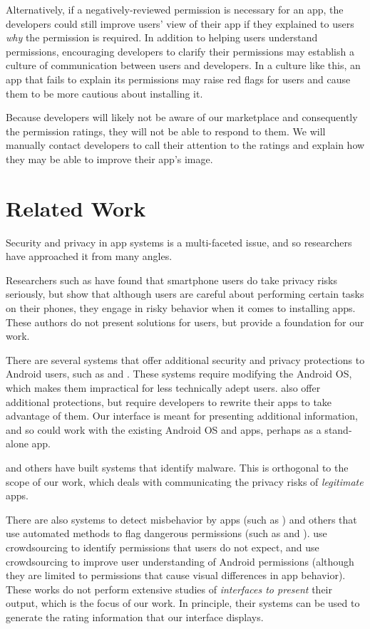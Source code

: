 \documentclass[11pt]{article}
\begin{document}
Alternatively, if a negatively-reviewed permission is necessary for
an app, the developers could still improve users' view of their app
if they explained to users \emph{why} the permission is required. In 
addition to helping users understand permissions, encouraging developers 
to clarify their permissions may establish a culture of communication
between users and developers. In a culture like this, an app that fails
to explain its permissions may raise red flags for users and cause them 
to be more cautious about 
installing it. 

Because developers will likely not be aware of our marketplace and 
consequently the permission ratings, they will not be able to respond 
to them. We will manually contact developers to call their attention
to the ratings and explain how they may be able to improve their 
app's image.


\section{Related Work}

Security and privacy in app systems is a multi-faceted issue, and 
so researchers have approached it from many angles.

Researchers such as \citet{99-problems-SPSM12} have found 
that smartphone users do take privacy risks seriously, but
\citet{smartphone-user-conf-SOUPS12} show that although
users are careful about
performing certain tasks on their phones, they engage in risky behavior
when it comes to installing apps. These
authors do not present solutions for users, but 
provide a foundation for our work.

There are several systems that offer additional 
security and privacy protections to Android users, such as 
\citet{mockDroid-HOTMOBILE11} and \citet{TISSA-Trust11}. 
These systems require modifying
the Android OS, which makes them impractical
for less technically adept users. 
\citet{dr-android-hide-SPSM12} also offer additional
protections, but require developers to rewrite their
apps to take advantage of them.
Our interface is meant
for presenting additional information, and so could work
with the existing Android OS and apps, perhaps as a stand-alone app.

\citet{android-repackaged-CODASPY12} and others have
built systems that identify
malware. This is orthogonal to the scope of our work, which
deals with communicating the privacy risks of \emph{legitimate} apps.

There are also systems to detect misbehavior by apps (such as
\citet{taintDroid-OSDI10})
and others that use
automated methods to flag dangerous permissions (such as \citet{droidrisk-2013} 
and \citet{whyper-SEC13}). \citet{expect-purpose-UbiComp12}
use crowdsourcing to identify permissions that users do not expect,
and \citet{droidganger-SPSM12} use crowdsourcing to improve user 
understanding of Android permissions (although they are limited
to permissions that cause visual differences in app behavior). 
These works do not perform
extensive studies of \emph{interfaces to present} their output, which
is the focus of our work. In principle, their systems can be used to
generate the rating information that our interface displays.
\end{document}
